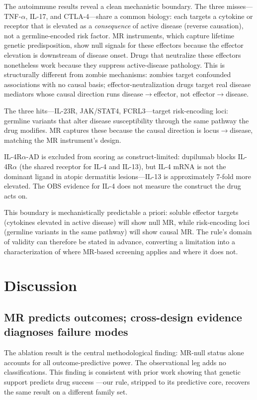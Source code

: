 \documentclass[11pt]{article}
\begin{document}
The autoimmune results reveal a clean mechanistic boundary. The three misses---TNF-$\alpha$, IL-17, and CTLA-4---share a common biology: each targets a cytokine or receptor that is elevated as a \emph{consequence} of active disease (reverse causation), not a germline-encoded risk factor. MR instruments, which capture lifetime genetic predisposition, show null signals for these effectors because the effector elevation is downstream of disease onset. Drugs that neutralize these effectors nonetheless work because they suppress active-disease pathology. This is structurally different from zombie mechanisms: zombies target confounded associations with no causal basis; effector-neutralization drugs target real disease mediators whose causal direction runs disease$\to$effector, not effector$\to$disease.

The three hits---IL-23R, JAK/STAT4, FCRL3---target risk-encoding loci: germline variants that alter disease susceptibility through the same pathway the drug modifies. MR captures these because the causal direction is locus$\to$disease, matching the MR instrument's design.

IL-4R$\alpha$-AD is excluded from scoring as construct-limited: dupilumab blocks IL-4R$\alpha$ (the shared receptor for IL-4 and IL-13), but IL-4 mRNA is not the dominant ligand in atopic dermatitis lesions---IL-13 is approximately 7-fold more elevated. The OBS evidence for IL-4 does not measure the construct the drug acts on.

This boundary is mechanistically predictable a priori: soluble effector targets (cytokines elevated in active disease) will show null MR, while risk-encoding loci (germline variants in the same pathway) will show causal MR. The rule's domain of validity can therefore be stated in advance, converting a limitation into a characterization of where MR-based screening applies and where it does not.

\section{Discussion}

\subsection{MR predicts outcomes; cross-design evidence diagnoses failure modes}

The ablation result is the central methodological finding: MR-null status alone accounts for all outcome-predictive power. The observational leg adds no classifications. This finding is consistent with prior work showing that genetic support predicts drug success \citep{nelson2015,minikel2024}---our rule, stripped to its predictive core, recovers the same result on a different family set.
\end{document}
